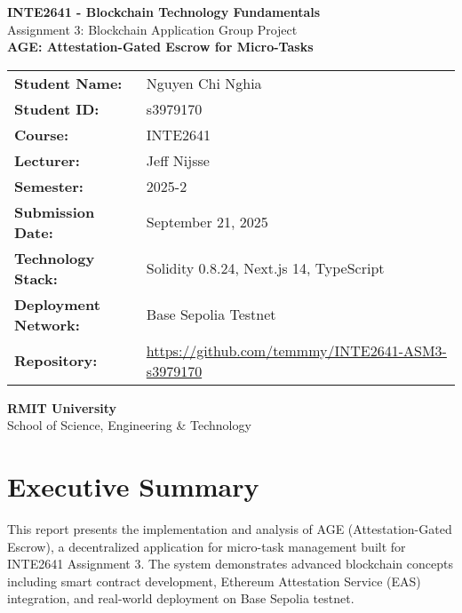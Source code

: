 \documentclass[12pt,a4paper]{article}
\begin{document}
\begin{titlepage}
    \centering
    \vspace*{2cm}

    {\LARGE\textbf{INTE2641 - Blockchain Technology Fundamentals}}\\[0.5cm]
    {\Large Assignment 3: Blockchain Application Group Project}\\[1.5cm]
    {\Large\textbf{AGE: Attestation-Gated Escrow for Micro-Tasks}}\\[1cm]

    \begin{tabular}{ll}
        \textbf{Student Name:} & Nguyen Chi Nghia \\[0.3cm]
        \textbf{Student ID:} & s3979170 \\[0.3cm]
        \textbf{Course:} & INTE2641 \\[0.3cm]
        \textbf{Lecturer:} & Jeff Nijsse \\[0.3cm]
        \textbf{Semester:} & 2025-2 \\[0.3cm]
        \textbf{Submission Date:} & September 21, 2025 \\[0.3cm]
        \textbf{Technology Stack:} & Solidity 0.8.24, Next.js 14, TypeScript \\[0.3cm]
        \textbf{Deployment Network:} & Base Sepolia Testnet \\[0.3cm]
        \textbf{Repository:} & \url{https://github.com/temmmy/INTE2641-ASM3-s3979170} \\[0.3cm]
    \end{tabular}

    \vfill

    {\large\textbf{RMIT University}}\\
    {\large School of Science, Engineering \& Technology}

\end{titlepage}

\tableofcontents
\newpage

\section{Executive Summary}

This report presents the implementation and analysis of AGE (Attestation-Gated Escrow), a decentralized application for micro-task management built for INTE2641 Assignment 3. The system demonstrates advanced blockchain concepts including smart contract development, Ethereum Attestation Service (EAS) integration, and real-world deployment on Base Sepolia testnet.
\end{document}
